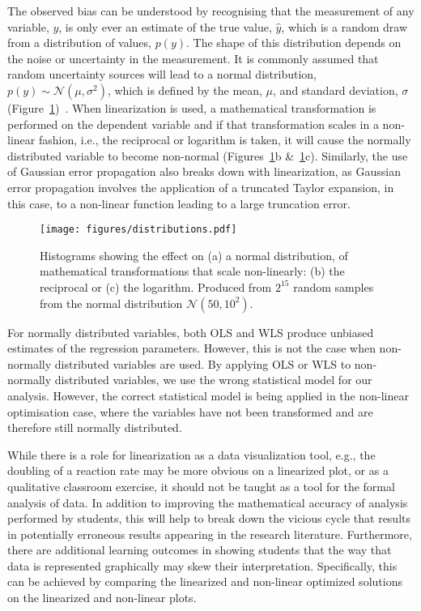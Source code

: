 \documentclass[journal=jceda8,manuscript=article]{achemso}
\begin{document}
The observed bias can be understood by recognising that the measurement of any variable, $y$, is only ever an estimate of the true value, $\hat{y}$, which is a random draw from a distribution of values, $p(y)$. 
The shape of this distribution depends on the noise or uncertainty in the measurement. 
It is commonly assumed that random uncertainty sources will lead to a normal distribution, $p(y) \sim \mathcal{N}(\mu, \sigma^2)$, which is defined by the mean, $\mu$, and standard deviation, $\sigma$ (Figure~\ref{fig:distributions})~\cite{monk_math_2010}.
When linearization is used, a mathematical transformation is performed on the dependent variable and if that transformation scales in a non-linear fashion, i.e., the reciprocal or logarithm is taken, it will cause the normally distributed variable to become non-normal (Figures~\ref{fig:distributions}b \&~\ref{fig:distributions}c).
Similarly, the use of Gaussian error propagation also breaks down with linearization, as Gaussian error propagation involves the application of a truncated Taylor expansion, in this case, to a non-linear function leading to a large truncation error.
%
\begin{figure}
  \texttt{[image: figures/distributions.pdf]}
  \caption{  
    Histograms showing the effect on (a) a normal distribution, of mathematical transformations that scale non-linearly: (b) the reciprocal or (c) the logarithm. 
    Produced from $2^{15}$ random samples from the normal distribution $\mathcal{N}(50, 10^2)$.
    }
  \label{fig:distributions}
\end{figure}
%

For normally distributed variables, both OLS and WLS produce unbiased estimates of the regression parameters. 
However, this is not the case when non-normally distributed variables are used. 
By applying OLS or WLS to non-normally distributed variables, we use the wrong statistical model for our analysis. 
However, the correct statistical model is being applied in the non-linear optimisation case, where the variables have not been transformed and are therefore still normally distributed. 

While there is a role for linearization as a data visualization tool, e.g., the doubling of a reaction rate may be more obvious on a linearized plot, or as a qualitative classroom exercise, it should not be taught as a tool for the formal analysis of data. 
In addition to improving the mathematical accuracy of analysis performed by students, this will help to break down the vicious cycle that results in potentially erroneous results appearing in the research literature.
Furthermore, there are additional learning outcomes in showing students that the way that data is represented graphically may skew their interpretation.
Specifically, this can be achieved by comparing the linearized and non-linear optimized solutions on the linearized and non-linear plots. 
\end{document}
